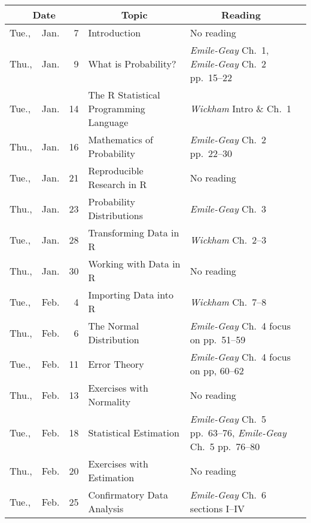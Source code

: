 \documentclass[11pt,twoside]{jgsyllabus}\usepackage[]{graphicx}\usepackage[]{xcolor}
\begin{document}
\setlength{\aboverulesep}{0.2ex}
\setlength{\belowrulesep}{0.2ex}
\setlength{\extrarowheight}{0.1ex}
\setlength{\heavyrulewidth}{0.5pt}
\setlength{\lightrulewidth}{0.05pt}
\begin{center}
\begin{tabular}{l@{~}c@{~}r>{\raggedright}m{2.6in}>{\centering}m{2in}c}
  \toprule
  \multicolumn{3}{c}{\bfseries Date} & \multicolumn{1}{c}{\bfseries Topic} &\multicolumn{1}{c}{\bfseries Reading} &\\
 \midrule
Tue., & Jan. &   7 & Introduction & No reading &  \\ 
   \midrule
Thu., & Jan. &   9 & What is Probability? & \emph{Emile-Geay\/} Ch.~1, \emph{Emile-Geay\/} Ch.~2 pp.~15--22 &  \\ 
   \midrule
Tue., & Jan. &  14 & The R Statistical Programming Language & \emph{Wickham\/} Intro \& Ch.~1 &  \\ 
   \midrule
Thu., & Jan. &  16 & Mathematics of Probability & \emph{Emile-Geay\/} Ch.~2 pp.~22--30 &  \\ 
   \midrule
Tue., & Jan. &  21 & Reproducible Research in R & No reading &  \\ 
   \midrule
Thu., & Jan. &  23 & Probability Distributions & \emph{Emile-Geay\/} Ch.~3 &  \\ 
   \midrule
Tue., & Jan. &  28 & Transforming Data in R & \emph{Wickham\/} Ch.~2--3 &  \\ 
   \midrule
Thu., & Jan. &  30 & Working with Data in R & No reading &  \\ 
   \midrule
Tue., & Feb. &   4 & Importing Data into R & \emph{Wickham\/} Ch.~7--8 &  \\ 
   \midrule
Thu., & Feb. &   6 & The Normal Distribution & \emph{Emile-Geay\/} Ch.~4 focus on pp.~51--59 &  \\ 
   \midrule
Tue., & Feb. &  11 & Error Theory & \emph{Emile-Geay\/} Ch.~4 focus on pp, 60--62 &  \\ 
   \midrule
Thu., & Feb. &  13 & Exercises with Normality & No reading &  \\ 
   \midrule
Tue., & Feb. &  18 & Statistical Estimation & \emph{Emile-Geay\/} Ch.~5 pp.~63--76, \emph{Emile-Geay\/} Ch.~5 pp.~76--80 &  \\ 
   \midrule
Thu., & Feb. &  20 & Exercises with Estimation & No reading &  \\ 
   \midrule
Tue., & Feb. &  25 & Confirmatory Data Analysis & \emph{Emile-Geay\/} Ch.~6 sections I--IV &  \\ 

\end{tabular}
\end{center}
\end{document}

